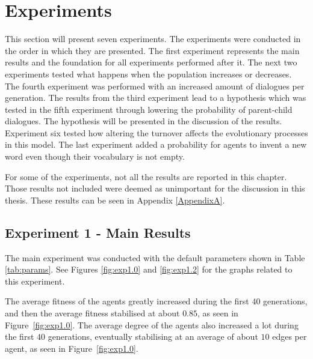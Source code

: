 \section{Experiments}
This section will present seven experiments. The experiments were conducted in the order in which they are presented. The first experiment represents the main results and the foundation for all experiments performed after it. The next two experiments tested what happens when the population increases or decreases. The fourth experiment was performed with an increased amount of dialogues per generation. The results from the third experiment lead to a hypothesis which was tested in the fifth experiment through lowering the probability of parent-child dialogues. The hypothesis will be presented in the discussion of the results. Experiment six tested how altering the turnover affects the evolutionary processes in this model. The last experiment added a probability for agents to invent a new word even though their vocabulary is not empty.

For some of the experiments, not all the results are reported in this chapter. Those results not included were deemed as unimportant for the discussion in this thesis. These results can be seen in Appendix \ref{AppendixA}.

\subsection{Experiment 1 - Main Results}
The main experiment was conducted with the default parameters shown in Table \ref{tab:params}. See Figures \ref{fig:exp1.0} and \ref{fig:exp1.2} for the graphs related to this experiment.

The average fitness of the agents greatly increased during the first $40$ generations, and then the average fitness stabilised at about $0.85$, as seen in Figure~\ref{fig:exp1.0}. The average degree of the agents also increased a lot during the first $40$ generations, eventually stabilising at an average of about $10$ edges per agent, as seen in Figure~\ref{fig:exp1.0}. 

